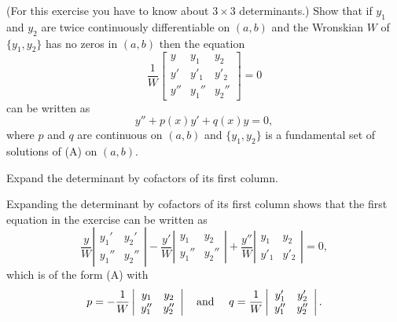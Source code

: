 \documentclass{ximera}
\begin{document}
\begin{problem}\label{exer:5.1.34}
(For this exercise you have to know about $3\times 3$
determinants.)
Show that if $y_1$ and $y_2$ are twice continuously differentiable on
$(a,b)$ and the Wronskian $W$ of $\{y_1,y_2\}$ has no zeros in
$(a,b)$ then the equation
$$\frac{1}{W}\begin{bmatrix}y & y_1 & y_2\\
y' & y'_1 & y'_2 \\
y'' & y_1'' & y_2''\end{bmatrix}=0$$
can be written as
\begin{equation}\label{eq:eqA5.1.34}
y''+p(x)y'+q(x)y=0,
\end{equation}
where $p$ and $q$ are continuous on $(a,b)$ and $\{y_1,y_2\}$ is a
fundamental set of solutions of (A) on $(a,b)$.
\begin{hint}
    Expand the determinant by cofactors of its first column.
\end{hint}

\begin{solution}
    Expanding  the determinant by cofactors of its first column shows that
the first equation in the exercise can be written as
$$
\frac{y}{ W}\left| \begin{array}{cc}
y_1' & y_2' \\
y_1'' & y_2''
\end{array} \right|-
\frac{y'}{ W}\left| \begin{array}{cc}
y_1 & y_2 \\
y_1'' & y_2''
\end{array} \right|+
\frac{y''}{ W}\left| \begin{array}{cc}
y_1 & y_2 \\
y'_1 & y'_2
\end{array} \right|=0,
$$
which is of the form (A) with
$$
p=-\frac{1}{ W}\left| \begin{array}{cc}
y_1 & y_2 \\
y_1'' & y_2''
\end{array} \right|
\mbox{\quad and \quad}
q=\frac{1}{ W}\left| \begin{array}{cc}
y_1' & y_2' \\
y_1'' & y_2''
\end{array} \right|.
$$
\end{solution}
\end{problem}
\end{document}
